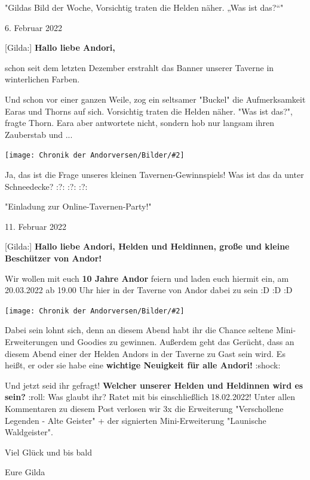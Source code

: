 \documentclass[10pt, a4paper, oneside]{book}
\newcommand{\bildmitts}[2][height=0.32\textwidth,width=0.48\textwidth,keepaspectratio]{%
    \begin{center}
        \texttt{[image: Chronik der Andorversen/Bilder/\#2]}
    \end{center}
}
\begin{document}
\begin{multicols}{2}
\begin{center}
    "Gildas Bild der Woche, Vorsichtig traten die Helden näher. „Was ist das?“"

    6. Februar 2022
\end{center}



[Gilda:] \textbf{Hallo liebe Andori,}

schon seit dem letzten Dezember erstrahlt das Banner unserer Taverne in winterlichen Farben.

Und schon vor einer ganzen Weile, zog ein seltsamer "Buckel" die Aufmerksamkeit Earas und Thorns auf sich. Vorsichtig traten die Helden näher. "Was ist das?", fragte Thorn. Eara aber antwortete nicht, sondern hob nur langsam ihren Zauberstab und ...

\bildmitts{AA2022 Was ist das 1.jpeg}

Ja, das ist die Frage unseres kleinen Tavernen-Gewinnspiels! Was ist das da unter Schneedecke? :?: :?: :?:


\begin{center}
    "Einladung zur Online-Tavernen-Party!"

    11. Februar 2022
\end{center}


[Gilda:] \textbf{Hallo liebe Andori, Helden und Heldinnen, große und kleine Beschützer von Andor!}

Wir wollen mit euch \textbf{10 Jahre Andor} feiern und laden euch hiermit ein, am 20.03.2022 ab 19.00 Uhr hier in der Taverne von Andor dabei zu sein :D :D :D

\bildmitts{AA2022 Einladung zur Online-Tavernen-Party.jpeg}

Dabei sein lohnt sich, denn an diesem Abend habt ihr die Chance seltene Mini-Erweiterungen und Goodies zu gewinnen. Außerdem geht das Gerücht, dass an diesem Abend einer der Helden Andors in der Taverne zu Gast sein wird. Es heißt, er oder sie habe eine \textbf{wichtige Neuigkeit für alle Andori!} :shock:

Und jetzt seid ihr gefragt! \textbf{Welcher unserer Helden und Heldinnen wird es sein?} :roll: Was glaubt ihr? Ratet mit bis einschließlich 18.02.2022! Unter allen Kommentaren zu diesem Post verlosen wir 3x die Erweiterung "Verschollene Legenden - Alte Geister" + der signierten Mini-Erweiterung "Launische Waldgeister".


Viel Glück und bis bald

Eure Gilda


\end{multicols}
\end{document}

